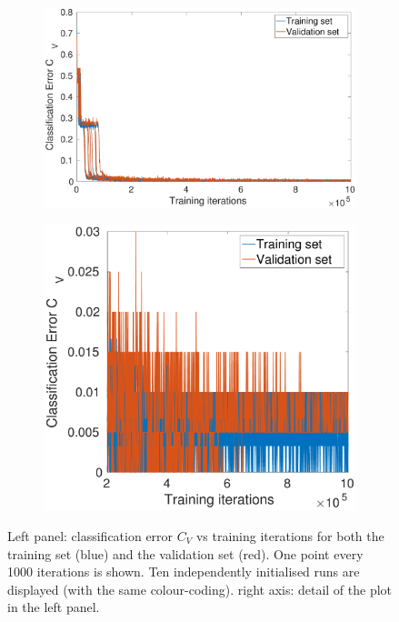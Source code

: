 \documentclass[12pt,titlepage]{article}
\begin{document}
\begin{figure}[H]
\centering
    \begin{subfigure}[b]{0.58\textwidth}
        \includegraphics[width=\textwidth]{../Figures/twoHL_error.pdf}
        \caption{}
    \end{subfigure} %
    \hfill %
    \begin{subfigure}[b]{0.41\textwidth}
        \includegraphics[width=\textwidth]{../Figures/twoHL_error_zoom.pdf}
        \caption{}
    \end{subfigure} %
\caption{\footnotesize Left panel: classification error $C_V$ vs training iterations for both the training set (blue) and the validation set (red). One point every 1000 iterations is shown. Ten independently initialised runs are displayed (with the same colour-coding). right axis: detail of the plot in the left panel.}
\label{fig:2e}
\end{figure}
\end{document}

